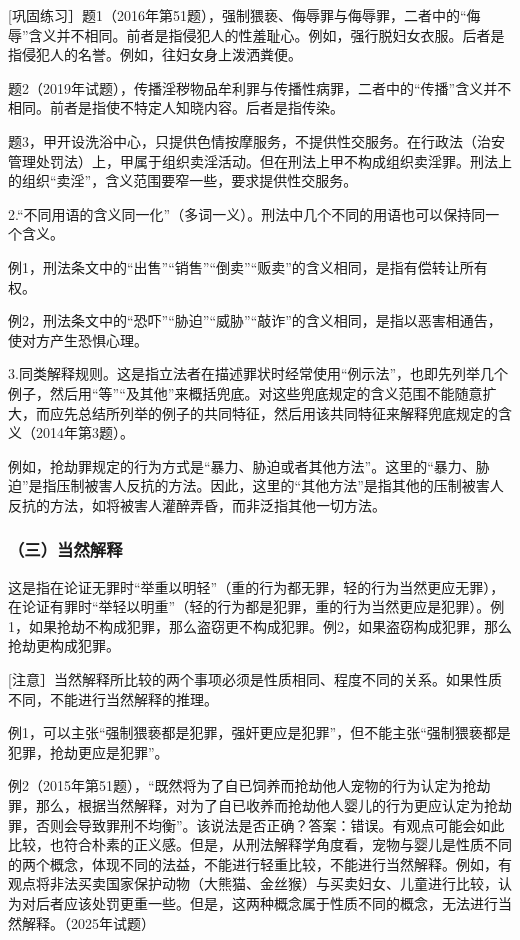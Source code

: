 [巩固练习］题1（2016年第51题），强制猥亵、侮辱罪与侮辱罪，二者中的“侮辱”含义并不相同。前者是指侵犯人的性羞耻心。例如，强行脱妇女衣服。后者是指侵犯人的名誉。例如，往妇女身上泼洒粪便。

题2（2019年试题），传播淫秽物品牟利罪与传播性病罪，二者中的“传播”含义并不相同。前者是指使不特定人知晓内容。后者是指传染。

题3，甲开设洗浴中心，只提供色情按摩服务，不提供性交服务。在行政法（治安管理处罚法）上，甲属于组织卖淫活动。但在刑法上甲不构成组织卖淫罪。刑法上的组织“卖淫”，含义范围要窄一些，要求提供性交服务。

2.“不同用语的含义同一化”（多词一义）。刑法中几个不同的用语也可以保持同一个含义。

例1，刑法条文中的“出售”“销售”“倒卖”“贩卖”的含义相同，是指有偿转让所有权。

例2，刑法条文中的“恐吓”“胁迫”“威胁”“敲诈”的含义相同，是指以恶害相通告，使对方产生恐惧心理。

3.同类解释规则。这是指立法者在描述罪状时经常使用“例示法”，也即先列举几个例子，然后用“等”“及其他”来概括兜底。对这些兜底规定的含义范围不能随意扩大，而应先总结所列举的例子的共同特征，然后用该共同特征来解释兜底规定的含义（2014年第3题）。

例如，抢劫罪规定的行为方式是“暴力、胁迫或者其他方法”。这里的“暴力、胁迫”是指压制被害人反抗的方法。因此，这里的“其他方法”是指其他的压制被害人反抗的方法，如将被害人灌醉弄昏，而非泛指其他一切方法。

\subsubsection*{（三）当然解释}

这是指在论证无罪时“举重以明轻”（重的行为都无罪，轻的行为当然更应无罪），在论证有罪时“举轻以明重”（轻的行为都是犯罪，重的行为当然更应是犯罪）。例1，如果抢劫不构成犯罪，那么盗窃更不构成犯罪。例2，如果盗窃构成犯罪，那么抢劫更构成犯罪。

[注意］当然解释所比较的两个事项必须是性质相同、程度不同的关系。如果性质不同，不能进行当然解释的推理。

例1，可以主张“强制猥亵都是犯罪，强奸更应是犯罪”，但不能主张“强制猥亵都是犯罪，抢劫更应是犯罪”。

例2（2015年第51题），“既然将为了自已饲养而抢劫他人宠物的行为认定为抢劫罪，那么，根据当然解释，对为了自已收养而抢劫他人婴儿的行为更应认定为抢劫罪，否则会导致罪刑不均衡”。该说法是否正确？答案：错误。有观点可能会如此比较，也符合朴素的正义感。但是，从刑法解释学角度看，宠物与婴儿是性质不同的两个概念，体现不同的法益，不能进行轻重比较，不能进行当然解释。例如，有观点将非法买卖国家保护动物（大熊猫、金丝猴）与买卖妇女、儿童进行比较，认为对后者应该处罚更重一些。但是，这两种概念属于性质不同的概念，无法进行当然解释。（2025年试题）

